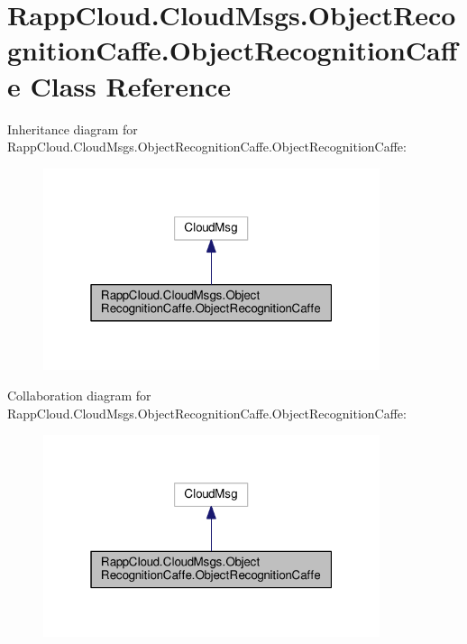 \hypertarget{classRappCloud_1_1CloudMsgs_1_1ObjectRecognitionCaffe_1_1ObjectRecognitionCaffe}{\section{Rapp\-Cloud.\-Cloud\-Msgs.\-Object\-Recognition\-Caffe.\-Object\-Recognition\-Caffe Class Reference}
\label{classRappCloud_1_1CloudMsgs_1_1ObjectRecognitionCaffe_1_1ObjectRecognitionCaffe}
}


Inheritance diagram for Rapp\-Cloud.\-Cloud\-Msgs.\-Object\-Recognition\-Caffe.\-Object\-Recognition\-Caffe\-:
\nopagebreak
\begin{figure}[H]
\begin{center}
\leavevmode
\includegraphics[width=280pt]{classRappCloud_1_1CloudMsgs_1_1ObjectRecognitionCaffe_1_1ObjectRecognitionCaffe__inherit__graph}
\end{center}
\end{figure}


Collaboration diagram for Rapp\-Cloud.\-Cloud\-Msgs.\-Object\-Recognition\-Caffe.\-Object\-Recognition\-Caffe\-:
\nopagebreak
\begin{figure}[H]
\begin{center}
\leavevmode
\includegraphics[width=280pt]{classRappCloud_1_1CloudMsgs_1_1ObjectRecognitionCaffe_1_1ObjectRecognitionCaffe__coll__graph}
\end{center}
\end{figure}
